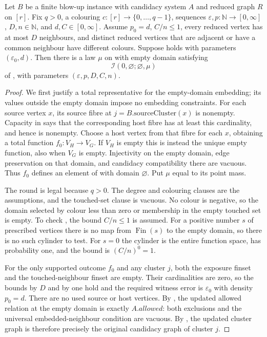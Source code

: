 \begin{lemma}
Let $B$ be a finite blow-up instance with candidacy system $A$ and reduced
graph $R$ on $[r]$. Fix $q>0$, a colouring $c:[r]\to\{0,\ldots,q-1\}$,
sequences $\varepsilon,p:\mathbb N\to[0,\infty]$, $D,n\in\mathbb N$,
and $d,C\in[0,\infty]$. Assume $p_0=d$, $C/n\leq1$, every reduced
vertex has at most $D$ neighbours, and distinct reduced vertices that are
adjacent or have a common neighbour have different colours.
Suppose  holds with parameters
$(\varepsilon_0,d)$. Then there is a law $\mu$ on
 with empty domain satisfying
\[
 \mathcal I(0,\varnothing;\varnothing,\mu)
\]
of , with parameters $(\varepsilon,p,D,C,n)$.
\end{lemma}
\begin{proof}
We first justify a total representative for the empty-domain embedding;
its values outside the empty domain impose no embedding constraints.
For each source vertex $x$, its source fibre at
$j=B.\mathrm{sourceCluster}(x)$ is nonempty. Capacity in
 says that the corresponding host fibre has at
least this cardinality, and hence is nonempty. Choose a host vertex from
that fibre for each $x$, obtaining a total function $f_0:V_H\to V_G$.
If $V_H$ is empty this is instead the unique empty function, also when
$V_G$ is empty. Injectivity on the empty domain, edge preservation on that
domain, and candidacy compatibility there are vacuous. Thus $f_0$ defines
an element of  with domain
$\varnothing$. Put $\mu$ equal to its point mass.

The round is legal because $q>0$. The degree and colouring clauses are
the assumptions, and the touched-set clause is vacuous. No colour is
negative, so the domain selected by colour less than zero or membership
in the empty touched set is empty. To check ,
the bound $C/n\leq1$ is assumed. For a positive number $s$ of prescribed
vertices there is no map from $\operatorname{Fin}(s)$ to the empty domain,
so there is no such cylinder to test. For $s=0$ the cylinder is the entire
function space, has probability one, and the bound is $(C/n)^0=1$.

For the only supported outcome $f_0$ and any cluster $j$, both the
exposure finset and the touched-neighbour finset are empty. Their
cardinalities are zero, so the bounds by $D$ and by one hold and the
required witness error is $\varepsilon_0$ with density $p_0=d$.
There are no used source or host vertices. By ,
the updated allowed relation at the empty domain is exactly $A.allowed$:
both exclusions and the universal embedded-neighbour condition are
vacuous. By , the updated cluster graph
is therefore precisely the original candidacy graph of cluster $j$.


\end{proof}
